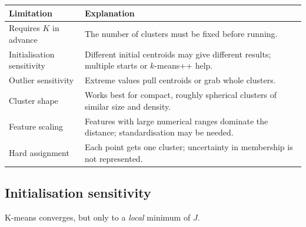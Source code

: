 \documentclass[11pt,a4paper]{article}
\begin{document}
\begin{center}
\renewcommand{\arraystretch}{1.2}
\begin{tabular}{@{}p{3.3cm}p{11.7cm}@{}}
\toprule
Limitation & Explanation\\
\midrule
Requires $K$ in advance & The number of clusters must be fixed before running.\\
Initialisation sensitivity & Different initial centroids may give different results; multiple starts or $k$-means++ help.\\
Outlier sensitivity & Extreme values pull centroids or grab whole clusters.\\
Cluster shape & Works best for compact, roughly spherical clusters of similar size and density.\\
Feature scaling & Features with large numerical ranges dominate the distance; standardisation may be needed.\\
Hard assignment & Each point gets one cluster; uncertainty in membership is not represented.\\
\bottomrule
\end{tabular}
\end{center}

\subsection{Initialisation sensitivity}\label{sec:init}

K-means converges, but only to a \emph{local} minimum of $J$.
\end{document}

